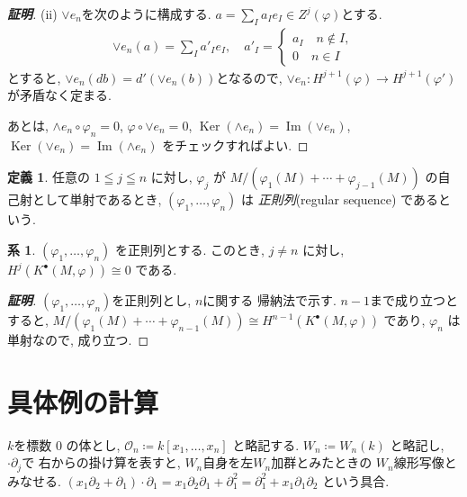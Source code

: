 \documentclass[11pt, a4paper, dvipdfmx]{jsarticle}
\theoremstyle{definition}
\newtheorem{Definition}[Axiom]{定義}
\newtheorem{Corollary}[Axiom]{系}
\newcommand{\mcal}{\mathcal}
\newcommand{\p}{\partial}
\newcommand{\Ker}{\mathop{\mathrm{Ker}}\nolimits}
\newcommand{\Img}{\mathop{\mathrm{Im}}\nolimits}
\newcommand{\pphi}{\varphi} %
\numberwithin{equation}{section}
\begin{document}
\begin{proof}[{\bf 証明}]
    (ii) 
    $\vee e_n$を次のように構成する. 
    $a = \sum_I a_Ie_I \in Z^j(\pphi)$とする. 
    \begin{align*}
        \vee e_n(a)= \sum_I a'_Ie_I, 
        \quad a'_I = 
        \begin{cases}
            a_I\quad n\notin I, \\
            0 \quad n\in I
        \end{cases}
    \end{align*}
    とすると, 
    $\vee e_n (db) = d'(\vee e_n (b))$となるので, 
    $\vee e_n\colon H^{j+1}(\pphi) \to H^{j+1}(\pphi')$
    が矛盾なく定まる. 

    あとは, 
    $\wedge e_n\circ\pphi_n = 0$, 
    $\pphi\circ\vee e_n = 0$, 
    $\Ker(\wedge e_n) = \Img(\vee e_n)$, 
    $\Ker(\vee e_n) = \Img(\wedge e_n)$
    をチェックすればよい. 
\end{proof}

\begin{Definition}
    任意の $1\leqq j \leqq n$ に対し, 
    $\pphi_j$ が 
    $M/\left( \pphi_1(M)+\cdots+\pphi_{j-1}(M) \right)$
    の自己射として単射であるとき, 
    $(\pphi_1,\ldots,\pphi_n)$ は
    \emph{正則列}(regular sequence) 
    であるという. 
\end{Definition}

\begin{Corollary}\label{cor:regular}
    $(\pphi_1,\ldots,\pphi_n)$ を正則列とする. 
    このとき, $j\neq n$ に対し, 
    $H^j(K^\bullet(M,\pphi))\cong 0$
    である. 
\end{Corollary}

\begin{proof}[{\bf 証明}]
    $(\pphi_1,\ldots, \pphi_n)$を正則列とし, $n$に関する
    帰納法で示す. $n-1$まで成り立つとすると, 
    $M/(\pphi_1(M) + \cdots + \pphi_{n-1}(M))
    \cong H^{n-1}(K^\bullet(M,\pphi))$
    であり, $\pphi_n$ は単射なので, 成り立つ. 
\end{proof}

\section{具体例の計算}

$k$を標数 0 の体とし, 
$\mcal{O}_n \coloneqq k[x_1,\ldots, x_n]$
と略記する. 
$W_n \coloneqq W_n(k)$ と略記し, $\cdot\p_j$で
右からの掛け算を表すと, 
$W_n$自身を左$W_n$加群とみたときの
$W_n$線形写像とみなせる. 
$(x_1\p_2 + \p_1)\cdot\p_1
=x_1\p_2\p_1 + \p_1^2
=\p_1^2 +x_1\p_1\p_2$
という具合. 
\end{document}
